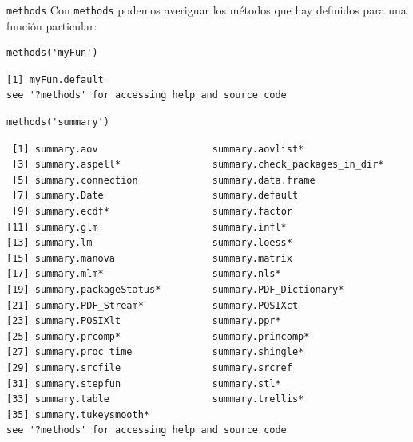\documentclass[xcolor={usenames,svgnames,dvipsnames}]{beamer}
\begin{document}
\begin{frame}[fragile,label={sec:org040eef9}]{\texttt{methods}}
 Con \texttt{methods} podemos averiguar los métodos que hay definidos para una función particular:
\lstset{language=r,label= ,caption= ,captionpos=b,numbers=none}
\begin{lstlisting}
methods('myFun')
\end{lstlisting}

\begin{verbatim}
[1] myFun.default
see '?methods' for accessing help and source code
\end{verbatim}

\lstset{language=r,label= ,caption= ,captionpos=b,numbers=none}
\begin{lstlisting}
methods('summary')
\end{lstlisting}

\begin{verbatim}
 [1] summary.aov                    summary.aovlist*              
 [3] summary.aspell*                summary.check_packages_in_dir*
 [5] summary.connection             summary.data.frame            
 [7] summary.Date                   summary.default               
 [9] summary.ecdf*                  summary.factor                
[11] summary.glm                    summary.infl*                 
[13] summary.lm                     summary.loess*                
[15] summary.manova                 summary.matrix                
[17] summary.mlm*                   summary.nls*                  
[19] summary.packageStatus*         summary.PDF_Dictionary*       
[21] summary.PDF_Stream*            summary.POSIXct               
[23] summary.POSIXlt                summary.ppr*                  
[25] summary.prcomp*                summary.princomp*             
[27] summary.proc_time              summary.shingle*              
[29] summary.srcfile                summary.srcref                
[31] summary.stepfun                summary.stl*                  
[33] summary.table                  summary.trellis*              
[35] summary.tukeysmooth*          
see '?methods' for accessing help and source code
\end{verbatim}
\end{frame}
\end{document}

